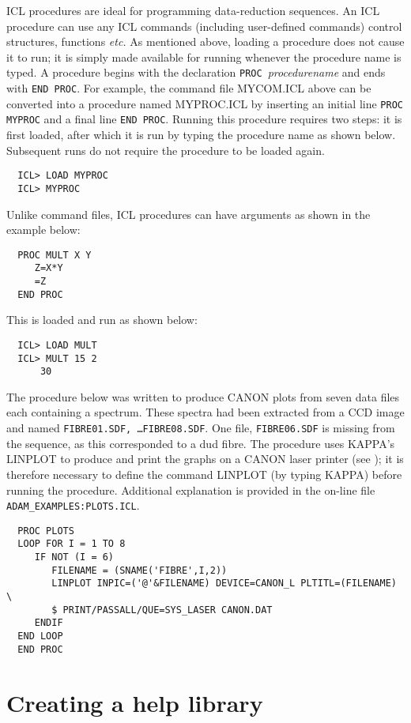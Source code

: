 ICL procedures are ideal for programming data-reduction sequences.
An ICL procedure can use any ICL commands (including user-defined commands)
control structures, functions {\it etc.} 
As mentioned above, loading a procedure does not
cause it to run; it is simply made available for running whenever the 
procedure name is typed.
A procedure begins with the declaration {\tt PROC}~{\sl procedurename}
and ends with {\tt END PROC}.
For example, the command file MYCOM.ICL above can be converted into a 
procedure named MYPROC.ICL by inserting an initial line 
\verb+PROC MYPROC+ and a final line \verb+END PROC+.
Running this procedure requires two steps: it is  first loaded, after which 
it is 
run by typing the procedure name
as shown below.
Subsequent runs do not require the procedure to be loaded again.
\begin{verbatim}
  ICL> LOAD MYPROC      
  ICL> MYPROC          
\end{verbatim}
Unlike command files, ICL procedures can have arguments as shown in the
example below:
\begin{verbatim}
  PROC MULT X Y
     Z=X*Y
     =Z
  END PROC
\end{verbatim}
This is loaded and run as shown below:
\begin{verbatim}
  ICL> LOAD MULT
  ICL> MULT 15 2
      30
\end{verbatim}
The procedure below was written to produce CANON plots from seven 
data files each containing a spectrum. 
These spectra had been extracted from a CCD image and named 
{\tt FIBRE01.SDF,  \ldots FIBRE08.SDF}. One file, 
{\tt FIBRE06.SDF}  is missing from the sequence, as this corresponded to 
a dud fibre.
The procedure uses KAPPA's LINPLOT to produce and print
the graphs on a CANON laser printer (see ); it is
therefore necessary to define the command LINPLOT 
(by typing KAPPA) before running the procedure. Additional explanation is 
provided in the on-line file {\tt ADAM\_EXAMPLES:PLOTS.ICL}.
\begin{verbatim}
  PROC PLOTS
  LOOP FOR I = 1 TO 8
     IF NOT (I = 6)
        FILENAME = (SNAME('FIBRE',I,2))
        LINPLOT INPIC=('@'&FILENAME) DEVICE=CANON_L PLTITL=(FILENAME) \
        $ PRINT/PASSALL/QUE=SYS_LASER CANON.DAT
     ENDIF
  END LOOP
  END PROC
\end{verbatim}

\newpage
\section{Creating a help library\label{help}}

